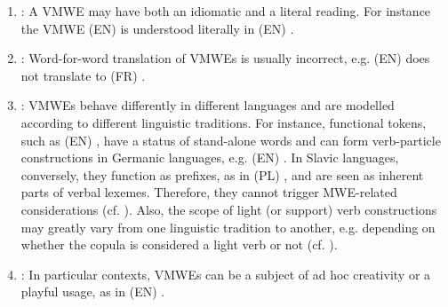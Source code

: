 \documentclass[output=paper,
modfonts,
]{langscibook}
\begin{document}
\begin{enumerate}
\item\label{prop:readings} : A VMWE may have both an idiomatic and a literal reading. For instance the VMWE (EN)  is understood literally in (EN) . 
\item\label{prop:trans}:  Word-for-word translation of VMWEs is usually incorrect, e.g. (EN)  does not translate to (FR) . 
\item\label{prop:multi}: VMWEs behave differently in different languages and are modelled according to different linguistic traditions. For instance, functional tokens, such as (EN) , have a status of stand-alone words and can form verb-particle constructions in Germanic languages, e.g. (EN) . In Slavic languages, conversely, they function as prefixes, as in (PL) , and are seen as inherent parts of verbal lexemes. Therefore, they cannot trigger MWE-related considerations (cf. ). Also, the scope of light (or support) verb constructions may greatly vary from one linguistic tradition to another, e.g. depending on whether the copula  is considered a light verb or not (cf. ).



\item\label{prop:create} : In particular contexts, VMWEs can be a subject of ad hoc creativity or a playful usage, as in (EN) . %
\end{enumerate}
\end{document}
